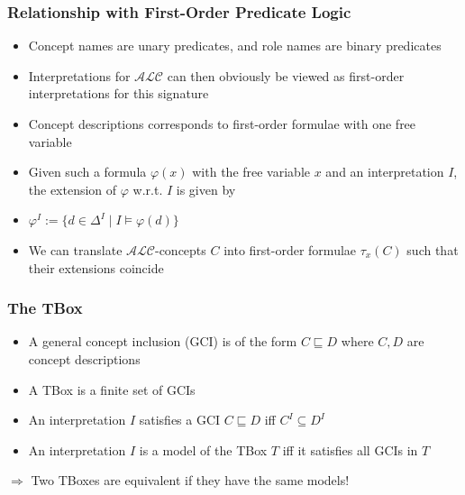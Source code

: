 \documentclass[conference]{styles/acmsiggraph}
\begin{document}
        
    
    
        
        
        \subsubsection{Relationship with First-Order Predicate Logic}
            \begin{itemize}
                \item Concept names are unary predicates, and role names are binary predicates
                \item Interpretations for $\mathcal{ALC}$ can then obviously be viewed as first-order interpretations for this signature
                \item Concept descriptions corresponds to first-order formulae with one free variable
                \item Given such a formula $\varphi(x)$ with the free variable $x$ and an interpretation $I$, the extension of $\varphi$ w.r.t. $I$ is given by
                \item $\varphi^I := \{d \in \Delta^I \mid I \vDash \varphi(d)\}$
                \item We can translate $\mathcal{ALC}$-concepts $C$ into first-order formulae $\tau_x(C)$ such that their extensions coincide
            \end{itemize}
        
        \subsubsection{The TBox}
            \begin{itemize}
                \item A general concept inclusion (GCI) is of the form $C \sqsubseteq D$ where $C,D$ are concept descriptions
                \item A TBox is a finite set of GCIs
                \item An interpretation $I$ satisfies a GCI $C \sqsubseteq D$ iff $C^I \subseteq D^I$
                \item An interpretation $I$ is a model of the TBox $T$ iff it satisfies all GCIs in $T$
            \end{itemize}
            $\Rightarrow$ Two TBoxes are equivalent if they have the same models!
        
\end{document}
